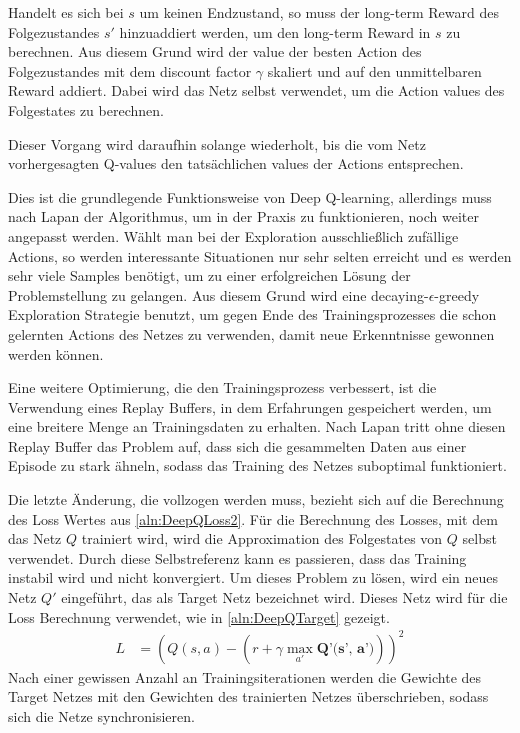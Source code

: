 \documentclass[11pt]{scrartcl}
\begin{document}
Handelt es sich bei $s$ um keinen Endzustand, so muss der long-term Reward des
Folgezustandes $s'$ hinzuaddiert werden, um den long-term Reward in $s$ zu berechnen. Aus
diesem Grund wird der value der besten Action des Folgezustandes mit dem discount factor
$\gamma$ skaliert und auf den unmittelbaren Reward addiert. Dabei wird das Netz selbst
verwendet, um die Action values des Folgestates zu berechnen.

Dieser Vorgang wird daraufhin solange wiederholt, bis die vom Netz vorhergesagten Q-values
den tat\-säch\-lich\-en values der Actions entsprechen.

Dies ist die grundlegende Funktionsweise von Deep Q-learning, allerdings muss nach Lapan
\cite[~S.202]{L2018} der Algorithmus, um in der Praxis zu funktionieren, noch weiter
angepasst werden. Wählt man bei der Exploration ausschließlich zufällige Actions, so
werden interessante Situationen nur sehr selten erreicht und es werden sehr viele Samples
benötigt, um zu einer erfolgreichen Lösung der Problemstellung zu gelangen. Aus diesem
Grund wird eine decaying-$\epsilon$-greedy Exploration Strategie benutzt, um gegen Ende
des Trainingsprozesses die schon gelernten Actions des Netzes zu verwenden, damit neue
Erkenntnisse gewonnen werden können.

Eine weitere Optimierung, die den Trainingsprozess verbessert, ist die Verwendung eines
Replay Buffers, in dem Erfahrungen gespeichert werden, um eine breitere Menge an
Trainingsdaten zu erhalten. Nach Lapan \cite[~S.204]{L2018} tritt ohne diesen Replay
Buffer das Problem auf, dass sich die gesammelten Daten aus einer Episode zu stark
ähneln, sodass das Training des Netzes suboptimal funktioniert.

Die letzte Änderung, die vollzogen werden muss, bezieht sich auf die Berechnung des Loss
Wertes aus \autoref{aln:DeepQLoss2}. Für die Berechnung des Losses, mit dem das Netz $Q$
trainiert wird, wird die Approximation des Folgestates von $Q$ selbst verwendet. Durch
diese Selbstreferenz kann es passieren, dass das Training instabil wird und nicht
konvergiert. Um dieses Problem zu lösen, wird ein neues Netz $Q'$ eingeführt, das als
Target Netz bezeichnet wird. Dieses Netz wird für die Loss Berechnung verwendet, wie in
\autoref{aln:DeepQTarget} gezeigt.
\begin{align}
  L & = \left(Q(s, a) - \left(r + \gamma \max_{a'} \textbf{Q'(s', a')}\right)\right)^2
  \label{aln:DeepQTarget}
\end{align}
\noindent
Nach einer gewissen Anzahl an Trainingsiterationen werden die Gewichte des Target Netzes
mit den Gewichten des trainierten Netzes überschrieben, sodass sich die Netze
synchronisieren.
\end{document}

